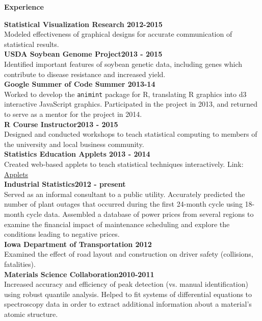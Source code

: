 \documentclass[letterpaper,12pt,final]{memoir}
\newcommand{\SmallSep}{\vspace{0.5em}}
\newcommand{\CVSection}[1]
	{\Large\textbf{#1}\par
	\SmallSep\normalsize\normalfont}
\newcommand{\CVItem}[1]
	{\textbf{\color{RoyalBlue} #1}}
\begin{document}
\CVSection{Experience}
\begin{multicols}{2}
\CVItem{Statistical Visualization Research \hfill 2012-2015}\\
{\small Modeled effectiveness of graphical designs for accurate communication of statistical results. \SmallSep\\}
\CVItem{USDA Soybean Genome Project\hfill 2013 - 2015}\\
{\small Identified important features of soybean genetic data, including genes which contribute to disease resistance and increased yield.\SmallSep\\}
\CVItem{Google Summer of Code \hfill Summer 2013-14}\\
{\small Worked to develop the \texttt{animint} package for R, translating R graphics into d3 interactive JavaScript graphics. Participated in the project in 2013, and returned to serve as a mentor for the project in 2014. \SmallSep\\}
\CVItem{R Course Instructor\hfill 2013 - 2015}\\
{\small Designed and conducted workshops to teach statistical computing to members of the university and local business community. \SmallSep\\}
\CVItem{Statistics Education Applets \hfill 2013 - 2014}\\
{\small Created web-based applets to teach statistical techniques interactively. Link: \href{http://vanderplas.dyndns-remote.com:3838/}{Applets} \SmallSep\\}
\CVItem{Industrial Statistics\hfill 2012 - present}\\
{\small Served as an informal consultant to a public utility. Accurately predicted the number of plant outages that occurred during the first 24-month cycle using 18-month cycle data. Assembled a database of power prices from several regions to examine the financial impact of maintenance scheduling and explore the conditions leading to negative prices.\SmallSep\\}
\CVItem{Iowa Department of Transportation \hfill 2012}\\
{\small Examined the effect of road layout and construction on driver safety (collisions, fatalities).\SmallSep\\}
\CVItem{Materials Science Collaboration\hfill 2010-2011}\\
{\small Increased accuracy and efficiency of peak detection (vs. manual identification) using robust quantile analysis. 
Helped to fit systems of differential equations to spectroscopy data in order to extract additional information about a material's atomic structure. \SmallSep\\}
\end{multicols}
\end{document}
